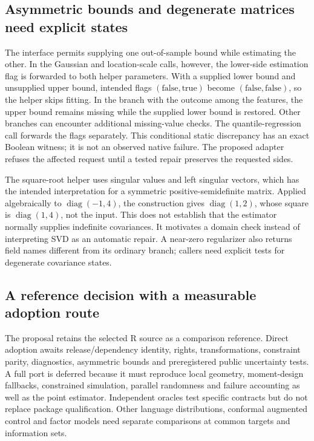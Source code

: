 \subsection{Asymmetric bounds and degenerate matrices need explicit states}
The interface permits supplying one out-of-sample bound while estimating
the other. In the Gaussian and location-scale calls, however, the
lower-side estimation flag is forwarded to both helper parameters.
With a supplied lower bound and unsupplied upper bound, intended flags
$(\mathrm{false},\mathrm{true})$ become
$(\mathrm{false},\mathrm{false})$, so the helper skips fitting. In the
branch with the outcome among the features, the upper bound remains
missing while the supplied lower bound is restored. Other branches can
encounter additional missing-value checks. The quantile-regression call
forwards the flags separately. This conditional static discrepancy has
an exact Boolean witness; it is not an observed native failure. The
proposed adapter refuses the affected request until a tested repair
preserves the requested sides.~\citep{exec24_scpi_source,exec24_scpi_choice}

The square-root helper uses singular values and left singular vectors,
which has the intended interpretation for a symmetric positive-semidefinite
matrix. Applied algebraically to $\operatorname{diag}(-1,4)$, the
construction gives $\operatorname{diag}(1,2)$, whose square is
$\operatorname{diag}(1,4)$, not the input. This does not establish that the
estimator normally supplies indefinite covariances. It motivates a domain
check instead of interpreting SVD as an automatic repair. A near-zero
regularizer also returns field names different from its ordinary branch;
callers need explicit tests for degenerate covariance states.
\citep{exec24_scpi_source,exec24_scpi_choice}

\subsection{A reference decision with a measurable adoption route}
The proposal retains the selected R source as a comparison reference.
Direct adoption awaits release/dependency identity, rights, transformations,
constraint parity, diagnostics, asymmetric bounds and preregistered public
uncertainty tests. A full port is deferred because it must reproduce local
geometry, moment-design fallbacks, constrained simulation, parallel
randomness and failure accounting as well as the point estimator.
Independent oracles test specific contracts but do not replace package
qualification. Other language distributions, conformal augmented control
and factor models need separate comparisons at common targets and
information sets.~\citep{exec24_scpi_choice}

